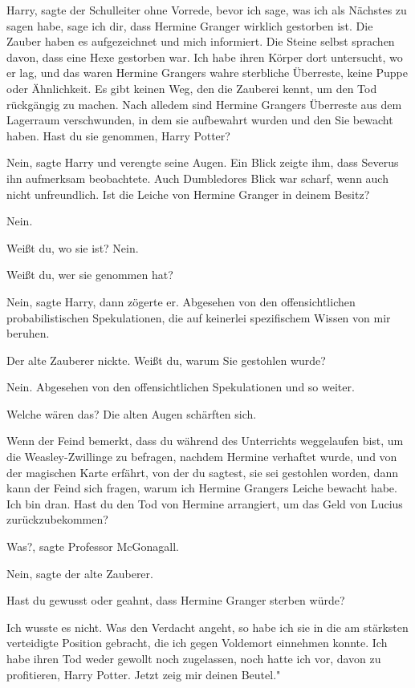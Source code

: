 \glqq Harry\grqq{}, sagte der Schulleiter ohne Vorrede, \glqq bevor ich sage,
was ich als Nächstes zu sagen habe, sage ich dir, dass Hermine Granger wirklich
gestorben ist. Die Zauber haben es aufgezeichnet und mich informiert. Die Steine
selbst sprachen davon, dass eine Hexe gestorben war. Ich habe ihren Körper dort
untersucht, wo er lag, und das waren Hermine Grangers wahre sterbliche
Überreste, keine Puppe oder Ähnlichkeit. Es gibt keinen Weg, den die Zauberei
kennt, um den Tod rückgängig zu machen. Nach alledem sind Hermine Grangers
Überreste aus dem Lagerraum verschwunden, in dem sie aufbewahrt wurden und den
Sie bewacht haben. Hast du sie genommen, Harry Potter?\grqq{}

\glqq Nein\grqq{}, sagte Harry und verengte seine Augen. Ein Blick zeigte ihm,
dass Severus ihn aufmerksam beobachtete. Auch Dumbledores Blick war scharf, wenn
auch nicht unfreundlich. \glqq Ist die Leiche von Hermine Granger in deinem
Besitz?\grqq{}

\glqq Nein.\grqq{}

\glqq Weißt du, wo sie ist?\grqq{} \glqq Nein.\grqq{}

\glqq  Weißt du, wer sie genommen hat?\grqq{}

\glqq Nein\grqq{}, sagte Harry, dann zögerte er. \glqq Abgesehen von den
offensichtlichen probabilistischen Spekulationen, die auf keinerlei spezifischem
Wissen von mir beruhen.\grqq{}

Der alte Zauberer nickte. \glqq  Weißt du, warum Sie gestohlen wurde?\grqq{}

\glqq Nein. Abgesehen von den offensichtlichen Spekulationen und so
weiter.\grqq{}

\glqq Welche wären das?\grqq{} Die alten Augen schärften sich.

\glqq Wenn der Feind bemerkt, dass du während des Unterrichts weggelaufen bist,
um die Weasley-Zwillinge zu befragen, nachdem Hermine verhaftet wurde, und von
der magischen Karte erfährt, von der du sagtest, sie sei gestohlen worden, dann
kann der Feind sich fragen, warum ich Hermine Grangers Leiche bewacht habe. Ich
bin dran. Hast du den Tod von Hermine arrangiert, um das Geld von Lucius
zurückzubekommen?\grqq{}

\glqq Was?\grqq{}, sagte Professor McGonagall.

\glqq Nein\grqq{}, sagte der alte Zauberer.

\glqq Hast du gewusst oder geahnt, dass Hermine Granger sterben würde?\grqq{}

\glqq Ich wusste es nicht. Was den Verdacht angeht, so habe ich sie in die am
stärksten verteidigte Position gebracht, die ich gegen Voldemort einnehmen
konnte. Ich habe ihren Tod weder gewollt noch zugelassen, noch hatte ich vor,
davon zu profitieren, Harry Potter. Jetzt zeig mir deinen Beutel."

